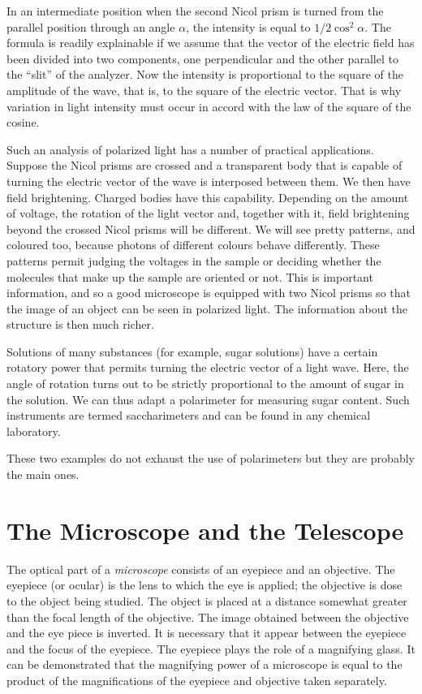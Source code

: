 In an intermediate position when the second Nicol prism is turned from the parallel position through an angle $\alpha$, the intensity is equal to $1/2 \cos^{2} \alpha$. The formula is readily explainable if we assume that the vector of the electric field has been divided into two components, one perpendicular and the other parallel to the ``slit'' of the analyzer. Now the intensity is proportional to the square of the amplitude of the wave, that is, to the square of the electric vector. That is why variation in light intensity must occur in accord with the law of the square of the cosine.

Such an analysis of polarized light has a number of practical applications. Suppose the Nicol prisms are crossed and a transparent body that is capable of turning the electric vector of the wave is interposed between them. We then have field brightening. Charged bodies have this capability. Depending on the amount of voltage, the rotation of the light vector and, together with it, field brightening beyond the crossed Nicol prisms will be different. We will see pretty patterns, and coloured too, because photons of different colours behave differ­ently. These patterns permit judging the voltages in the sample or deciding whether the molecules that make up the sample are oriented or not. This is important information, and so a good microscope is equipped with two Nicol prisms so that the image of an object can be seen in polarized light. The information about the struc­ture is then much richer.

Solutions of many substances (for example, sugar solu­tions) have a certain rotatory power that permits turning the electric vector of a light wave. Here, the angle of rotation turns out to be strictly proportional to the amount of sugar in the solution. We can thus adapt a polarimeter for measuring sugar content. Such instruments are termed saccharimeters and can be found in any chemical laboratory.

These two examples do not exhaust the use of polarimeters but they are probably the main ones.

\section{The Microscope and the Telescope}

The optical part of a \emph{microscope} consists of an eyepiece and an objective. The eyepiece (or ocular) is the lens to which the eye is applied; the objective is dose to the object being studied. The object is placed at a distance somewhat greater than the focal length of the objective. The image obtained between the objective and the eye­ piece is inverted. It is necessary that it appear between the eyepiece and the focus of the eyepiece. The eyepiece plays the role of a magnifying glass. It can be demonstrat­ed that the magnifying power of a microscope is equal to the product of the magnifications of the eyepiece and objective taken separately.

